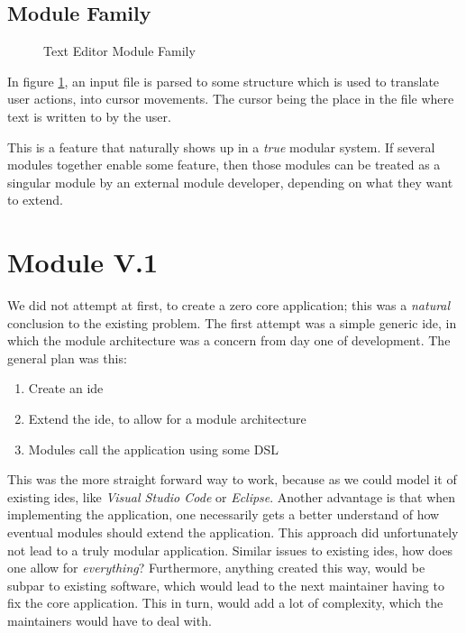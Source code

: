 \subsection{Module Family}

\begin{figure}
  \centering
  
  \caption{Text Editor Module Family}
  \label{fig:textEditorSimple}
\end{figure}

In figure \ref{fig:textEditorSimple}, an input file is parsed to some structure
which is used to translate user actions, into cursor movements. The cursor being
the place in the file where text is written to by the user.

This is a feature that naturally shows up in a \textit{true} modular system. If
several modules together enable some feature, then those modules can be treated
as a singular module by an external module developer, depending on what they
want to extend.

\section{Module V.1}

We did not attempt at first, to create a zero core application; this was a
\textit{natural} conclusion to the existing problem. The first attempt was a
simple generic \gls{ide}, in which the module architecture was a concern from
day one of development. The general plan was this:

\begin{enumerate}
  \item Create an \gls{ide}
  \item Extend the \gls{ide}, to allow for a module architecture
  \item Modules call the application using some DSL
\end{enumerate}

This was the more straight forward way to work, because as we could model it of
existing \gls{ide}s, like \textit{Visual Studio Code} or \textit{Eclipse}.
Another advantage is that when implementing the application, one necessarily
gets a better understand of how eventual modules should extend the application.
This approach did unfortunately not lead to a truly modular application. Similar
issues to existing \gls{ide}s, how does one allow for \textit{everything}?
Furthermore, anything created this way, would be subpar to existing software,
which would lead to the next maintainer having to fix the core application. This
in turn, would add a lot of complexity, which the maintainers would have to deal with.

